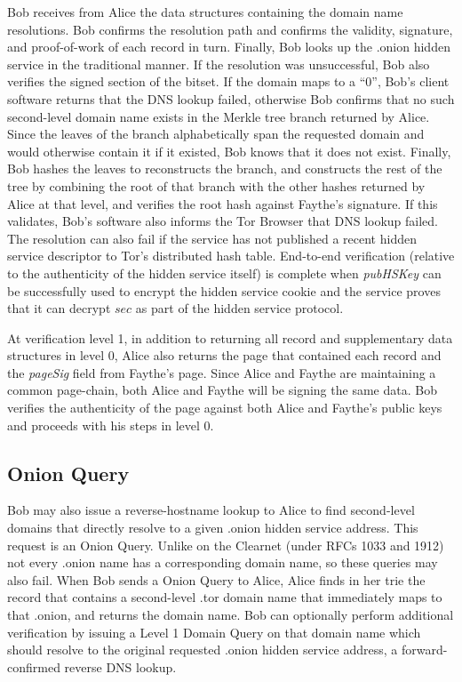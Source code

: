 Bob receives from Alice the data structures containing the domain name resolutions. Bob confirms the resolution path and confirms the validity, signature, and proof-of-work of each record in turn. Finally, Bob looks up the .onion hidden service in the traditional manner. If the resolution was unsuccessful, Bob also verifies the signed section of the bitset. If the domain maps to a ``0'', Bob's client software returns that the DNS lookup failed, otherwise Bob confirms that no such second-level domain name exists in the Merkle tree branch returned by Alice. Since the leaves of the branch alphabetically span the requested domain and would otherwise contain it if it existed, Bob knows that it does not exist. Finally, Bob hashes the leaves to reconstructs the branch, and constructs the rest of the tree by combining the root of that branch with the other hashes returned by Alice at that level, and verifies the root hash against Faythe's signature. If this validates, Bob's software also informs the Tor Browser that DNS lookup failed. The resolution can also fail if the service has not published a recent hidden service descriptor to Tor's distributed hash table. End-to-end verification (relative to the authenticity of the hidden service itself) is complete when \emph{pubHSKey} can be successfully used to encrypt the hidden service cookie and the service proves that it can decrypt $ sec $ as part of the hidden service protocol.


At verification level 1, in addition to returning all record and supplementary data structures in level 0, Alice also returns the page that contained each record and the \emph{pageSig} field from Faythe's page. Since Alice and Faythe are maintaining a common page-chain, both Alice and Faythe will be signing the same data. Bob verifies the authenticity of the page against both Alice and Faythe's public keys and proceeds with his steps in level 0.


%

\subsection{Onion Query}
\label{sec:OnionQuery}

Bob may also issue a reverse-hostname lookup to Alice to find second-level domains that directly resolve to a given .onion hidden service address. This request is an Onion Query. Unlike on the Clearnet (under RFCs 1033 and 1912) not every .onion name has a corresponding domain name, so these queries may also fail. When Bob sends a Onion Query to Alice, Alice finds in her trie the record that contains a second-level .tor domain name that immediately maps to that .onion, and returns the domain name. Bob can optionally perform additional verification by issuing a Level 1 Domain Query on that domain name which should resolve to the original requested .onion hidden service address, a forward-confirmed reverse DNS lookup.

